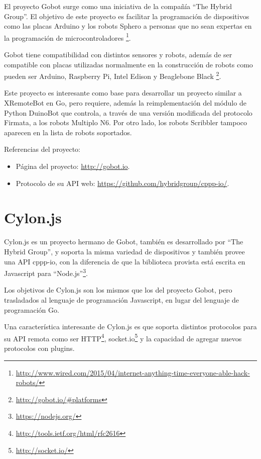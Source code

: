 El proyecto Gobot surge como una iniciativa de la compañía ``The Hybrid Group''.
El objetivo de este proyecto es facilitar la programación de
dispositivos como las placas Arduino y los robots
Sphero
a personas que no sean expertas en la programación de microcontroladores%
\footnote{\url{http://www.wired.com/2015/04/internet-anything-time-everyone-able-hack-robots/}}.


Gobot tiene compatibilidad con distintos sensores y robots, además de
ser compatible con
placas utilizadas normalmente en la construcción de robots como
pueden ser Arduino,
Raspberry Pi, Intel Edison y Beaglebone Black%
\footnote{\url{http://gobot.io/\#platforms}}.

Este proyecto es interesante como base para desarrollar un proyecto
similar a XRemoteBot en Go, pero requiere, además la reimplementación
del módulo de Python DuinoBot que controla, a través de una versión
modificada del protocolo Firmata, a los robots Multiplo N6. Por otro
lado, los robots Scribbler tampoco aparecen en la lista de robots soportados.

Referencias del proyecto:
\begin{itemize}
    \item Página del proyecto: \url{http://gobot.io}.
    \item Protocolo de su API web: \url{https://github.com/hybridgroup/cppp-io/}.
\end{itemize}


\section{Cylon.js}

Cylon.js es un proyecto hermano de Gobot, también es desarrollado
por ``The Hybrid Group'',
y soporta la misma variedad
de dispositivos y también provee una API cppp-io, con la diferencia
de que la biblioteca provista está escrita en Javascript para
``Node.js''\footnote{\url{https://nodejs.org/}}.

Los objetivos de Cylon.js son los mismos que los del proyecto Gobot,
pero trasladados al lenguaje de programación Javascript, en lugar
del lenguaje de programación Go.

Una característica interesante de Cylon.js es que soporta distintos
protocolos para su API remota como ser
HTTP\footnote{\url{http://tools.ietf.org/html/rfc2616}},
socket.io\footnote{\url{http://socket.io/}}
y la capacidad de agregar nuevos protocolos con plugins.

